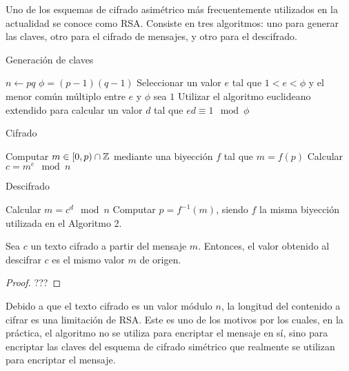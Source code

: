 Uno de los esquemas de cifrado asimétrico más frecuentemente utilizados en la actualidad se conoce como RSA. Consiste en tres algoritmos: uno para generar las claves, otro para el cifrado de mensajes, y otro para el descifrado.

\begin{algorithm}
	\caption{Generación de claves}\label{alg:1}
	$n \gets pq$ 
	$\phi = (p - 1)(q - 1)$\;
	Seleccionar un valor $e$ tal que $1 < e < \phi$ y el menor común múltiplo entre $e$ y $\phi$ sea $1$\;
	Utilizar el algoritmo euclideano extendido para calcular un valor $d$ tal que $ed \equiv 1 \mod \phi$\;
\end{algorithm}

\begin{algorithm}
	\caption{Cifrado}\label{alg:2}
	Computar $m \in [0, p) \cap \mathbb{Z}$ mediante una biyección $f$ tal que $m = f(p)$\;
	Calcular $c = m^e \mod n$\;
\end{algorithm}

\begin{algorithm}
	\caption{Descifrado}\label{alg:3}
	Calcular $m = c^d \mod n$\;
	Computar $p = f^{-1}(m)$, siendo $f$ la misma biyección utilizada en el Algoritmo 2.
\end{algorithm}

\newpage

\begin{theorem}
	Sea $c$ un texto cifrado a partir del mensaje $m$. Entonces, el valor obtenido al descifrar $c$ es el mismo valor $m$ de origen.
\end{theorem}

\begin{proof}
	???
\end{proof}

Debido a que el texto cifrado es un valor módulo $n$, la longitud del contenido a cifrar es una limitación de RSA. Este es uno de los motivos por los cuales, en la práctica, el algoritmo no se utiliza para encriptar el mensaje en sí, sino para encriptar las claves del esquema de cifrado simétrico que realmente se utilizan para encriptar el mensaje.

